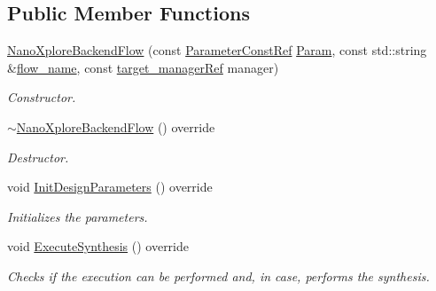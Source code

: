 \subsection*{Public Member Functions}
\begin{DoxyCompactItemize}
\item 
\hyperlink{classNanoXploreBackendFlow_aa2bfcacbbdd33d2ada15f5ad8d59f99e}{Nano\+Xplore\+Backend\+Flow} (const \hyperlink{Parameter_8hpp_a37841774a6fcb479b597fdf8955eb4ea}{Parameter\+Const\+Ref} \hyperlink{classBackendFlow_a7d21e7cf0afc64b13e0009c9e351873d}{Param}, const std\+::string \&\hyperlink{classBackendFlow_acb230ccab7e32cf0a88811097ff8c3f8}{flow\+\_\+name}, const \hyperlink{target__manager_8hpp_aee0b586a84fb6eb4faefa6e41e1735a9}{target\+\_\+manager\+Ref} manager)
\begin{DoxyCompactList}\small\item\em Constructor. \end{DoxyCompactList}\item 
\hyperlink{classNanoXploreBackendFlow_aba2aa50521a65b6980f6f4544c65767c}{$\sim$\+Nano\+Xplore\+Backend\+Flow} () override
\begin{DoxyCompactList}\small\item\em Destructor. \end{DoxyCompactList}\item 
void \hyperlink{classNanoXploreBackendFlow_a56157c2264c3b823bb2a6cb5d1386d63}{Init\+Design\+Parameters} () override
\begin{DoxyCompactList}\small\item\em Initializes the parameters. \end{DoxyCompactList}\item 
void \hyperlink{classNanoXploreBackendFlow_a068c9327512c0a9f5524433ebb52fde7}{Execute\+Synthesis} () override
\begin{DoxyCompactList}\small\item\em Checks if the execution can be performed and, in case, performs the synthesis. \end{DoxyCompactList}\end{DoxyCompactItemize}
